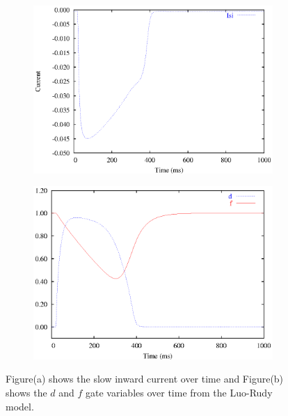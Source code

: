 \begin{figure}[hbtp] 
  \centering
  \begin{subfigure}[b]{0.45\linewidth}
    \centering
    \includegraphics[width=\textwidth]{cardiac_electrophysiology/epsfiles/LR_Isi.eps}
    \caption{}
  \end{subfigure}
  \hfill
  \begin{subfigure}[b]{0.45\linewidth}
    \centering
    \includegraphics[width=\textwidth]{cardiac_electrophysiology/epsfiles/LR_SIGates.eps}
    \caption{}
  \end{subfigure}
  \caption[Slow inward current from the Luo-Rudy model]{Figure(a) shows the
    slow inward current over time and Figure(b) shows the $d$ and
    $f$ gate variables over time from the Luo-Rudy model.}
  \label{fig:LR_Isi_traces}
\end{figure}
%
